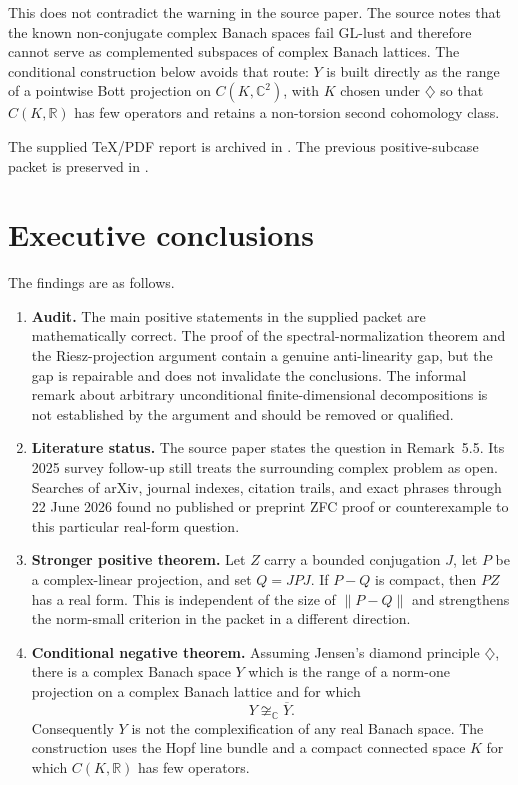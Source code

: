 \documentclass[11pt]{article}
\theoremstyle{definition}
\theoremstyle{remark}
\newcommand{\C}{\mathbb C}
\newcommand{\R}{\mathbb R}
\begin{document}
\medskip

This does not contradict the warning in the source paper.  The source notes
that the known non-conjugate complex Banach spaces fail GL-lust and therefore
cannot serve as complemented subspaces of complex Banach lattices.  The
conditional construction below avoids that route: \(Y\) is built directly as
the range of a pointwise Bott projection on \(C(K,\C^2)\), with \(K\) chosen
under \(\diamondsuit\) so that \(C(K,\R)\) has few operators and retains a
non-torsion second cohomology class.

\medskip

The supplied TeX/PDF report is archived in
.
The previous positive-subcase packet is preserved in
.

\tableofcontents

\section{Executive conclusions}

The findings are as follows.

\begin{enumerate}[label=\textbf{(\Alph*)},leftmargin=2.7em]
\item \textbf{Audit.} The main positive statements in the supplied packet are mathematically correct. The proof of the spectral-normalization theorem and the Riesz-projection argument contain a genuine anti-linearity gap, but the gap is repairable and does not invalidate the conclusions. The informal remark about arbitrary unconditional finite-dimensional decompositions is not established by the argument and should be removed or qualified.

\item \textbf{Literature status.} The source paper states the question in Remark~5.5. Its 2025 survey follow-up still treats the surrounding complex problem as open. Searches of arXiv, journal indexes, citation trails, and exact phrases through 22 June 2026 found no published or preprint ZFC proof or counterexample to this particular real-form question.

\item \textbf{Stronger positive theorem.} Let $Z$ carry a bounded conjugation $J$, let $P$ be a complex-linear projection, and set $Q=JPJ$. If $P-Q$ is compact, then $PZ$ has a real form. This is independent of the size of $\|P-Q\|$ and strengthens the norm-small criterion in the packet in a different direction.

\item \textbf{Conditional negative theorem.} Assuming Jensen's diamond principle $\diamondsuit$, there is a complex Banach space $Y$ which is the range of a norm-one projection on a complex Banach lattice and for which
\[
        Y\not\cong_{\C}\overline{Y}.
\]
Consequently $Y$ is not the complexification of any real Banach space. The construction uses the Hopf line bundle and a compact connected space $K$ for which $C(K,\R)$ has few operators.
\end{enumerate}
\end{document}
